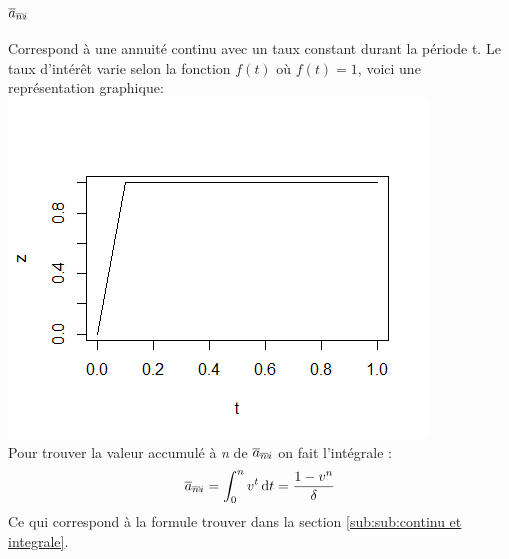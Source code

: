 \documentclass[11pt,french]{report}
\makeatletter
\DeclareRobustCommand{\annuity}[1]{%
\def\arraystretch{0}%
\setlength\arraycolsep{.7pt}%
\setlength\arrayrulewidth{.3pt}%
\begin{array}[b]{@{}c|}\hline
\\[\arraycolsep]%
\scriptstyle #1%
\end{array}%
}
\makeatother
\begin{document}
\subsubsection{$\overline{a}_{\annuity{n}i}$}
Correspond à une annuité continu avec un taux constant durant la période t. Le taux d'intérêt varie selon la fonction $f(t)$ où $f(t) =1$, voici une représentation graphique:
\\
\includegraphics[scale=0.60]{picture8.png}
\\
Pour trouver la valeur accumulé à \textit{n} de $\overline{a}_{\annuity{n}i}$ on fait l'intégrale :
\begin{align*}
\overline{a}_{\annuity{n}i} = \int_{0}^{n} v^{t} \, \mathrm{d}t = \frac{1 - v^{n}}{\delta}
\end{align*}
Ce qui correspond à la formule trouver dans la section \ref{sub:sub:continu et integrale}.
\end{document}
